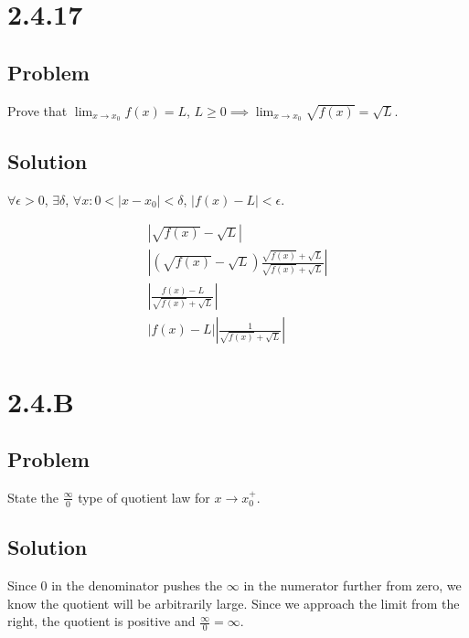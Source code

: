 \documentclass[12pt]{article}
\newcommand{\round}[1]{\left(       #1 \right)      }
\newcommand{\abs}  [1]{\left|       #1 \right|      }
\begin{document}
\section*{2.4.17}

\subsection*{Problem}

Prove that $\lim_{x \to x_0} f(x) = L$, $L \geq 0 \implies \lim_{x \to x_0} \sqrt{f(x)} = \sqrt{L}$.

\subsection*{Solution}

$\forall \epsilon > 0$, $\exists \delta$, $\forall x : 0 < \abs{x - x_0} < \delta$, $\abs{f(x) - L} < \epsilon$.

\begin{align*}
    \abs{\sqrt{f(x)} - \sqrt{L}} \\
    \abs{\round{\sqrt{f(x)} - \sqrt{L}} \frac{\sqrt{f(x)} + \sqrt{L}}{\sqrt{f(x)} + \sqrt{L}}} \\
    \abs{\frac{f(x) - L}{\sqrt{f(x)} + \sqrt{L}}} \\
    \abs{f(x) - L} \abs{\frac{1}{\sqrt{f(x)} + \sqrt{L}}}
\end{align*}



\section*{2.4.B}

\subsection*{Problem}

State the $\frac{\infty}{0}$ type of quotient law for $x \to x_0^+$.

\subsection*{Solution}

Since 0 in the denominator pushes the $\infty$ in the numerator further from zero, we know the quotient will be arbitrarily large. Since we approach the limit from the right, the quotient is positive and $\frac{\infty}{0} = \infty$.
\end{document}

